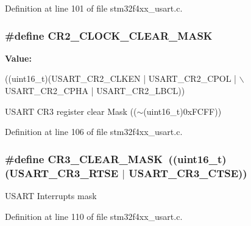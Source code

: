Definition at line 101 of file stm32f4xx\-\_\-usart.\-c.

\hypertarget{group___u_s_a_r_t_ga7834b3d9be4875de242f87c12fd79f02}{
\subsubsection[{C\-R2\-\_\-\-C\-L\-O\-C\-K\-\_\-\-C\-L\-E\-A\-R\-\_\-\-M\-A\-S\-K}]{\setlength{\rightskip}{0pt plus 5cm}\#define C\-R2\-\_\-\-C\-L\-O\-C\-K\-\_\-\-C\-L\-E\-A\-R\-\_\-\-M\-A\-S\-K}}\label{group___u_s_a_r_t_ga7834b3d9be4875de242f87c12fd79f02}
{\bfseries Value\-:}
\begin{DoxyCode}
((uint16\_t)(USART\_CR2\_CLKEN | USART\_CR2\_CPOL | \(\backslash\)
                                              USART\_CR2\_CPHA | USART\_CR2\_LBCL))
\end{DoxyCode}
U\-S\-A\-R\-T C\-R3 register clear Mask (($\sim$(uint16\-\_\-t)0x\-F\-C\-F\-F)) 

Definition at line 106 of file stm32f4xx\-\_\-usart.\-c.

\hypertarget{group___u_s_a_r_t_ga5c882571db73abc5d1837368a1cb0a64}{
\subsubsection[{C\-R3\-\_\-\-C\-L\-E\-A\-R\-\_\-\-M\-A\-S\-K}]{\setlength{\rightskip}{0pt plus 5cm}\#define C\-R3\-\_\-\-C\-L\-E\-A\-R\-\_\-\-M\-A\-S\-K~((uint16\-\_\-t)(U\-S\-A\-R\-T\-\_\-\-C\-R3\-\_\-\-R\-T\-S\-E $|$ U\-S\-A\-R\-T\-\_\-\-C\-R3\-\_\-\-C\-T\-S\-E))}}\label{group___u_s_a_r_t_ga5c882571db73abc5d1837368a1cb0a64}
U\-S\-A\-R\-T Interrupts mask 

Definition at line 110 of file stm32f4xx\-\_\-usart.\-c.



